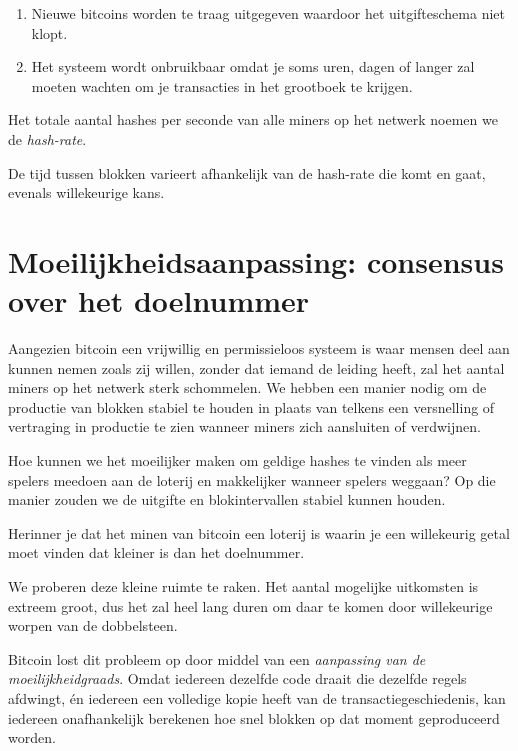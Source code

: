 \documentclass[
  letterpaper,
]{scrbook}
\begin{document}
\begin{enumerate}
\def\labelenumi{\arabic{enumi}.}
\item
  Nieuwe bitcoins worden te traag uitgegeven waardoor het uitgifteschema
  niet klopt.
\item
  Het systeem wordt onbruikbaar omdat je soms uren, dagen of langer zal
  moeten wachten om je transacties in het grootboek te krijgen.
\end{enumerate}

Het totale aantal hashes per seconde van alle miners op het netwerk
noemen we de \emph{hash-rate}.

{De tijd tussen blokken varieert afhankelijk van de hash-rate die komt
en gaat, evenals willekeurige kans.}

\hypertarget{moeilijkheidsaanpassing-consensus-over-het-doelnummer}{%
\section{Moeilijkheidsaanpassing: consensus over het
doelnummer}\label{moeilijkheidsaanpassing-consensus-over-het-doelnummer}}

Aangezien bitcoin een vrijwillig en permissieloos systeem is waar mensen
deel aan kunnen nemen zoals zij willen, zonder dat iemand de leiding
heeft, zal het aantal miners op het netwerk sterk schommelen. We hebben
een manier nodig om de productie van blokken stabiel te houden in plaats
van telkens een versnelling of vertraging in productie te zien wanneer
miners zich aansluiten of verdwijnen.

Hoe kunnen we het moeilijker maken om geldige hashes te vinden als meer
spelers meedoen aan de loterij en makkelijker wanneer spelers weggaan?
Op die manier zouden we de uitgifte en blokintervallen stabiel kunnen
houden.

Herinner je dat het minen van bitcoin een loterij is waarin je een
willekeurig getal moet vinden dat kleiner is dan het doelnummer.

{We proberen deze kleine ruimte te raken. Het aantal mogelijke
uitkomsten is extreem groot, dus het zal heel lang duren om daar te
komen door willekeurige worpen van de dobbelsteen.}

Bitcoin lost dit probleem op door middel van een \emph{aanpassing van de
moeilijkheidgraads}. Omdat iedereen dezelfde code draait die dezelfde
regels afdwingt, én iedereen een volledige kopie heeft van de
transactiegeschiedenis, kan iedereen onafhankelijk berekenen hoe snel
blokken op dat moment geproduceerd worden.
\end{document}
